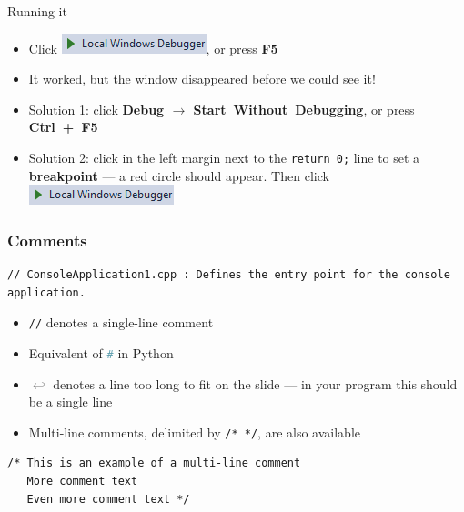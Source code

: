\begin{frame}[fragile]{Running it}
	\begin{itemize}
		\item Click \includegraphics[height=2ex]{run_button.png}, or press \textbf{F5} \pause
		\item It worked, but the window disappeared before we could see it! \pause
		\item Solution 1: click \textbf{Debug $\to$ Start~Without~Debugging}, or press \textbf{Ctrl~+~F5}
		\item Solution 2: click in the left margin next to the \lstinline{return 0;} line to set a \textbf{breakpoint} ---
			a red circle should appear. Then click \includegraphics[height=2ex]{run_button.png}
	\end{itemize}
\end{frame}

\begin{frame}[fragile]
	\frametitle{Comments}
	\begin{lstlisting}
// ConsoleApplication1.cpp : Defines the entry point for the console application.
	\end{lstlisting}
	\pause
	\begin{itemize}
		\item \lstinline{//} denotes a single-line comment \pause
		\item Equivalent of \lstinline[language=Python]{#} in Python \pause
		\item \textcolor{Gray}{$\hookleftarrow$} denotes a line too long to fit on the slide ---
			in your program this should be a single line \pause
		\item Multi-line comments, delimited by \lstinline{/* */}, are also available
	\end{itemize}
	\begin{lstlisting}
/* This is an example of a multi-line comment
   More comment text
   Even more comment text */
	\end{lstlisting}
\end{frame}

